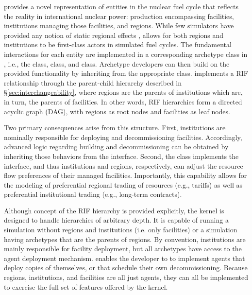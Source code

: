 \Cyclus provides a novel representation of entities in the nuclear fuel cycle
that reflects the reality in international nuclear power: production
encompassing facilities, institutions managing those facilities, and regions. While
few simulators have provided any notion of static regional
effects \cite{huff_next_2010,juchau_modeling_2010}, \Cyclus allows for both regions and institutions to be first-class
actors in simulated fuel cycles. The fundamental interactions for each entity are implemented in a corresponding
archetype class in \Cyclus, i.e., the  class, 
class, and  class. Archetype developers can then build on the
provided functionality by inheriting from the appropriate class.
\Cyclus implements a \gls{RIF} relationship through the
parent-child hierarchy described in \S \ref{sec:interchangeability}, where
regions are the parents of institutions which are, in turn, the parents of
facilities. In other words, \gls{RIF} hierarchies form a directed acyclic graph (DAG),
with regions as root nodes and facilities as leaf nodes.

Two primary consequences arise from this structure. First, institutions are
nominally
responsible for deploying and decommissioning facilities. Accordingly, advanced
logic regarding building and decommissioning can be obtained by inheriting
those behaviors from the
 interface. Second, the  class implements the
 interface, and thus institutions and regions, respectively, can
adjust the resource flow preferences of their managed facilities. Importantly,
this capability allows for the modeling of preferential regional trading
of resources (e.g., tariffs) as well as preferential institutional trading
(e.g., long-term contracts).

Although concept of the \gls{RIF} hierarchy is provided explicitly, the \Cyclus kernel is
designed to handle hierarchies of arbitrary depth.  It is capable of
running a simulation without regions and institutions (i.e.  only facilities)
or a simulation having archetypes that are the parents of regions.  By
convention, institutions are mainly responsible for facility deployment, but
all archetypes have access to the agent deployment mechanism. \Cyclus enables
the developer to to implement agents that deploy copies of themselves, or that
schedule their own decommissioning.  Because regions, institutions, and
facilities are all just agents, they can all be implemented to exercise the
full set of features offered by the \Cyclus kernel.

